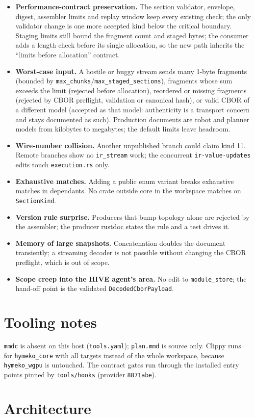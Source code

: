 \documentclass[11pt,a4paper]{article}
\begin{document}
\begin{itemize}
\item \textbf{Performance-contract preservation.} The section validator, envelope, digest, assembler limits and
replay window keep every existing check; the only validator change is one more accepted kind below the critical
boundary. Staging limits still bound the fragment count and staged bytes; the consumer adds a length check before its
single allocation, so the new path inherits the ``limits before allocation'' contract.
\item \textbf{Worst-case input.} A hostile or buggy stream sends many 1-byte fragments (bounded by
\texttt{max\_chunks}/\texttt{max\_staged\_sections}), fragments whose sum exceeds the limit (rejected before
allocation), reordered or missing fragments (rejected by CBOR preflight, validation or canonical hash), or valid CBOR
of a different model (accepted as that model: authenticity is a transport concern and stays documented as such).
Production documents are robot and planner models from kilobytes to megabytes; the default limits leave headroom.
\item \textbf{Wire-number collision.} Another unpublished branch could claim kind 11. Remote branches show no
\texttt{ir\_stream} work; the concurrent \texttt{ir-value-updates} edits touch \texttt{execution.rs} only.
\item \textbf{Exhaustive matches.} Adding a public enum variant breaks exhaustive matches in dependants. No crate
outside core in the workspace matches on \texttt{SectionKind}.
\item \textbf{Version rule surprise.} Producers that bump topology alone are rejected by the assembler; the producer
rustdoc states the rule and a test drives it.
\item \textbf{Memory of large snapshots.} Concatenation doubles the document transiently; a streaming decoder is not
possible without changing the CBOR preflight, which is out of scope.
\item \textbf{Scope creep into the HIVE agent's area.} No edit to \texttt{module\_store}; the hand-off point is the
validated \texttt{DecodedCborPayload}.
\end{itemize}

\section{Tooling notes}

\texttt{mmdc} is absent on this host (\texttt{tools.yaml}); \texttt{plan.mmd} is source only. Clippy runs for
\texttt{hymeko\_core} with all targets instead of the whole workspace, because \texttt{hymeko\_wgpu} is untouched.
The contract gates run through the installed entry points pinned by \texttt{tools/hooks} (provider
\texttt{8871abe}).

\section*{Architecture}
\begin{center}
\resizebox{\linewidth}{!}{}
\end{center}
\end{document}
